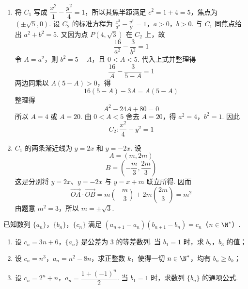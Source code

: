 \begin{solution}
\begin{enumerate}
\item 将 \(C_1\) 写成 \(\dfrac{x^2}{1}-\dfrac{y^2}{4}=1\)，所以其焦半距满足 \(c^2=1+4=5\)，焦点为 \((\pm\sqrt5,0)\). 设 \(C_2\) 的标准方程为
\(\frac{x^2}{a^2}-\frac{y^2}{b^2}=1\)，\(a>0\)，\(b>0\).
与 \(C_1\) 同焦点给出 \(a^2+b^2=5\). 又因为点 \(P(4,\sqrt3)\) 在 \(C_2\) 上，故
\[
\frac{16}{a^2}-\frac{3}{b^2}=1
\]
令 \(A=a^2\)，则 \(b^2=5-A\)，且 \(0<A<5\). 代入上式并整理得
\[
\frac{16}{A}-\frac{3}{5-A}=1
\]
两边同乘以 \(A(5-A)>0\)，得
\[
16(5-A)-3A=A(5-A)
\]
整理得
\[
A^2-24A+80=0
\]
所以 \(A=4\) 或 \(A=20\). 由 \(0<A<5\) 舍去 \(A=20\)，得 \(a^2=4\)，\(b^2=1\). 因此
\[
C_2:\frac{x^2}{4}-y^2=1
\]

\item \(C_1\) 的两条渐近线为 \(y=2x\) 和 \(y=-2x\). 设
\[
A=(m,2m)
\]
\[
B=\left(-\frac m3,\frac{2m}3\right)
\]
这是分别将 \(y=2x\)、\(y=-2x\) 与 \(y=x+m\) 联立所得. 因而
\[
\overrightarrow{OA}\cdot\overrightarrow{OB}
=m\left(-\frac m3\right)+2m\left(\frac{2m}3\right)=m^2
\]
由题意 \(m^2=3\)，所以 \(m=\pm\sqrt3\).
\end{enumerate}
\end{solution}

\begin{problem}
已知数列 \(\{a_n\}\)，\(\{b_n\}\)，\(\{c_n\}\) 满足 \((a_{n+1}-a_n)(b_{n+1}-b_n)=c_n\)（\(n\in\N^*\)）.

\begin{enumerate}
\item 设 \(c_n=3n+6\)，\(\{a_n\}\) 是公差为 \(3\) 的等差数列. 当 \(b_1=1\) 时，求 \(b_2\)，\(b_3\) 的值；
\item 设 \(c_n=n^3\)，\(a_n=n^2-8n\)，求正整数 \(k\)，使得一切 \(n\in\N^*\)，均有 \(b_n\ge b_k\)；
\item 设 \(c_n=2^n+n\)，\(a_n=\dfrac{1+(-1)^n}{2}\). 当 \(b_1=1\) 时，求数列 \(\{b_n\}\) 的通项公式.
\end{enumerate}
\end{problem}

